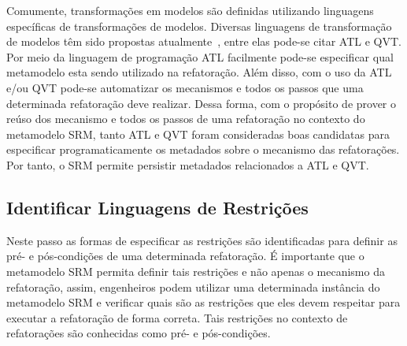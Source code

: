Comumente, transformações em modelos são definidas utilizando linguagens específicas de transformações de modelos. Diversas linguagens de transformação de modelos têm sido propostas atualmente~\cite{Biehl_2010, Allilaire_06}, entre elas pode-se citar ATL e QVT. Por meio da linguagem de programação ATL facilmente pode-se especificar qual metamodelo esta sendo utilizado na refatoração. Além disso, com o uso da ATL e/ou QVT pode-se automatizar os mecanismos e todos os passos que uma determinada refatoração deve realizar. Dessa forma, com o propósito de prover o reúso dos mecanismo e todos os passos de uma refatoração no contexto do metamodelo SRM, tanto ATL e QVT foram consideradas boas candidatas para especificar programaticamente os metadados sobre o mecanismo das refatorações. Por tanto, o SRM permite persistir metadados relacionados a ATL e QVT. %




\subsection{Identificar Linguagens de Restrições}
Neste passo as formas de especificar as restrições são identificadas para definir as pré- e pós-condições de uma determinada refatoração. É importante que o metamodelo SRM permita definir tais restrições e não apenas o mecanismo da refatoração, assim, engenheiros podem utilizar uma determinada instância do metamodelo SRM e verificar quais são as restrições que eles devem respeitar para executar a refatoração de forma correta. Tais restrições no contexto de refatorações são conhecidas como pré- e pós-condições\cite{OPDYKE_1992, Roberts_1999}.

